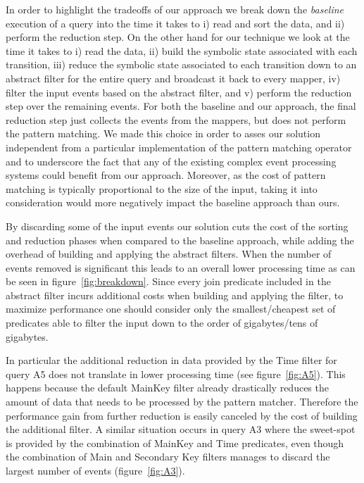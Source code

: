 In order to highlight the tradeoffs of our approach we break down the {\em
baseline} execution of a query into the time it takes to 
i) read and sort the data, and 
ii) perform the reduction step.
On the other hand for our technique we look at the time it takes to 
i) read the data, 
ii) build the symbolic state associated with each transition,
iii) reduce the symbolic state associated to each transition down to an abstract
filter for the entire query and broadcast it back to every mapper,
iv) filter the input events based on the abstract filter, and
v) perform the reduction step over the remaining events. 
For both the baseline and our approach, the final reduction 
step just collects the events from the mappers, but does not perform the 
pattern matching.
We made this choice in order to asses our solution independent
from a particular implementation of the pattern matching operator
and to underscore the fact that any of the existing complex event processing 
systems could benefit from our approach.
Moreover, as the cost of pattern matching is typically proportional to the size 
of the input, taking it into consideration would more negatively impact the 
baseline approach than ours. 

By discarding some of the input events our solution cuts the cost
of the sorting and reduction phases when compared to the baseline approach,
while adding the overhead of building and applying the abstract filters.
When the number of events removed is significant this leads to an overall lower
processing time as can be seen in figure~\ref{fig:breakdown}.
Since every join predicate included in the abstract filter incurs additional
costs when building and applying the filter, to maximize performance one should
consider only the smallest/cheapest set of predicates able to filter the input
down to the order of gigabytes/tens of gigabytes.


In particular the additional reduction in data provided by the
Time filter for query A5 does not translate in lower processing time (see
figure~\ref{fig:A5}).
This happens because the default MainKey filter already drastically reduces
the amount of data that needs to be processed by the pattern matcher. 
Therefore the performance gain from further reduction is easily canceled by the
cost of building the additional filter.
A similar situation occurs in query A3 where the sweet-spot is provided by the
combination of MainKey and Time predicates, even though the combination of
Main and Secondary Key filters manages to discard the largest number of events 
(figure~\ref{fig:A3}).





